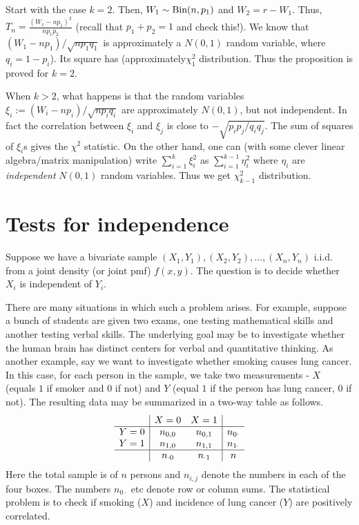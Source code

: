 \documentclass[preprint,  11pt]{amsart}
\begin{document}
 Start with the case $k=2$. Then, $W_{1}\sim \mbox{Bin}(n,p_{1})$ and $W_{2}=r-W_{1}$. Thus, $T_{n}=\frac{(W_{1}-np_{1})^{2}}{np_{1}p_{2}}$ (recall that $p_{1}+p_{2}=1$ and check this!). We know that $(W_{1}-np_{1})/\sqrt{np_{1}q_{1}}$ is approximately a $N(0,1)$ random variable, where $q_{i}=1-p_{i}$). Its square has (approximately$\chi_{1}^{2}$ distribution. Thus the proposition is proved for $k=2$.

When $k>2$, what happens is that the random variables $\xi_{i}:=(W_{i}-np_{i})/\sqrt{np_{i}q_{i}}$ are approximately $N(0,1)$, but not independent. In fact the correlation between $\xi_{i}$ and $\xi_{j}$ is  close to $-\sqrt{p_{i}p_{j}/q_{i}q_{j}}$. The sum of squares of $\xi_{i}$s  gives the $\chi^{2}$ statistic. On the other hand, one can (with some clever linear algebra/matrix manipulation) write $\sum_{i=1}^{k}\xi_{i}^{2}$ as $\sum_{i=1}^{k-1}\eta_{i}^{2}$ where $\eta_{i}$ are   {\em independent} $N(0,1)$ random variables. Thus we get $\chi_{k-1}^{2}$ distribution.

\section{Tests for independence}
Suppose we have a bivariate sample $(X_{1},Y_{1}),(X_{2},Y_{2}),\ldots ,(X_{n},Y_{n})$ i.i.d. from a joint density (or joint pmf) $f(x,y)$. The question is to decide whether $X_{i}$ is independent of $Y_{i}$.

\beg There are many situations in which such a problem arises. For example, suppose a bunch of students are given two exams, one testing mathematical skills and another testing verbal skills. The underlying goal may be to investigate whether the human brain has distinct centers for verbal and quantitative thinking.
\eeg
\beg As another example, say we want to investigate whether smoking causes lung cancer. In this case, for each person  in the sample, we take two measurements - $X$ (equals $1$ if smoker and $0$ if not) and $Y$ (equal $1$ if the person has lung cancer, $0$ if not). The resulting data may be summarized in a two-way table as follows.
$$
\begin{array}{c|cc|c}
 & X=0 & X=1 & \\
 \hline
 Y=0 & n_{0,0} & n_{0,1} & n_{0\cdot}\\
Y=1 & n_{1,0} & n_{1,1} & n_{1\cdot} \\
\hline
 & n_{\cdot 0} & n_{\cdot 1} & n
\end{array}
$$
Here the total sample is of $n$ persons and $n_{i,j}$ denote the numbers in each of the four boxes. The numbers $n_{0\cdot}$ etc denote row or column sums. The statistical problem is to check if smoking ($X$) and incidence of lung cancer ($Y$) are positively correlated.
\eeg
\end{document}
